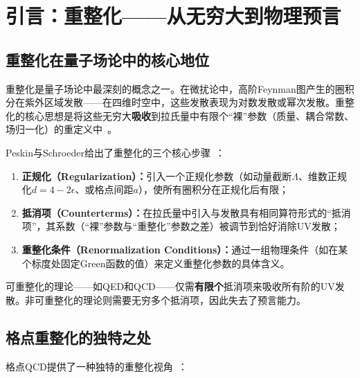 \documentclass[12pt,a4paper]{ctexart}
\theoremstyle{definition}
\begin{document}
\section{引言：重整化——从无穷大到物理预言}

\subsection{重整化在量子场论中的核心地位}

重整化是量子场论中最深刻的概念之一。在微扰论中，高阶Feynman图产生的圈积分在紫外区域发散——在四维时空中，这些发散表现为对数发散或幂次发散。重整化的核心思想是将这些无穷大\textbf{吸收}到拉氏量中有限个``裸''参数（质量、耦合常数、场归一化）的重定义中~\cite{PeskinSchroeder1995}。

Peskin与Schroeder给出了重整化的三个核心步骤~\cite{PeskinSchroeder1995}：
\begin{enumerate}[leftmargin=*]
    \item \textbf{正规化（Regularization）：}引入一个正规化参数（如动量截断$\Lambda$、维数正规化$d=4-2\epsilon$、或格点间距$a$），使所有圈积分在正规化后有限；
    \item \textbf{抵消项（Counterterms）：}在拉氏量中引入与发散具有相同算符形式的``抵消项''，其系数（``裸''参数与``重整化''参数之差）被调节到恰好消除UV发散；
    \item \textbf{重整化条件（Renormalization Conditions）：}通过一组物理条件（如在某个标度处固定Green函数的值）来定义重整化参数的具体含义。
\end{enumerate}

可重整化的理论——如QED和QCD——仅需\textbf{有限个}抵消项来吸收所有阶的UV发散。非可重整化的理论则需要无穷多个抵消项，因此失去了预言能力。

\subsection{格点重整化的独特之处}

格点QCD提供了一种独特的重整化视角~\cite{GattringerLang2010,Gupta1997intro}：
\end{document}
